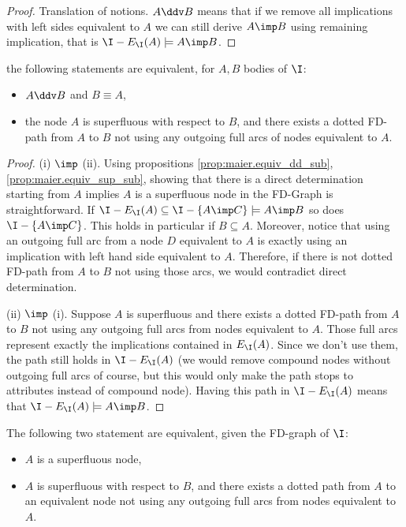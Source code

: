 \begin{proof}
Translation of notions. $A \ddv B$ means that if we remove all implications
with left sides equivalent to $A$ we can still derive $A \imp B$ using remaining
implication, that is $\I - E_{\I}(A) \models A \imp B$.
\end{proof}

\begin{proposition} \label{prop:maier.equiv_ssup_dd}
the following statements are equivalent, for $A, B$ bodies of $\I$:
\begin{itemize}
	\item[(i)] $A \ddv B$ and $B \equiv A$,
	\item[(ii)] the node $A$ is superfluous with respect to $B$, and there 
	exists 
	a dotted FD-path from $A$ to $B$ not using any outgoing full arcs of
	nodes equivalent to $A$.
\end{itemize}
	
\end{proposition}


\begin{proof} (i) $\imp$ (ii). Using propositions \ref{prop:maier.equiv_dd_sub},
\ref{prop:maier.equiv_sup_sub}, showing that there is a direct determination 
starting from $A$ implies $A$ is a superfluous node in the FD-Graph is 
straightforward. If $\I - E_{\I}(A) \subseteq \I - \{A \imp C \} \models A \imp 
B$ so does $\I - \{A \imp C \}$. This holds in particular if $B \subseteq A$. 
Moreover, notice that using an outgoing full arc from a node $D$ equivalent to 
$A$ is exactly using an implication with left hand side equivalent to $A$. 
Therefore, if there is not dotted FD-path from $A$ to $B$ not using those arcs, 
we would contradict direct determination.

\vspace{1.2em}

(ii) $\imp$ (i). Suppose $A$ is superfluous and there 
exists a dotted FD-path from $A$ to $B$ not using any outgoing full arcs 
from nodes equivalent to $A$. Those full arcs represent exactly the 
implications contained in $E_{\I}(A)$. Since we don't use them, the path still 
holds in $\I - E_{\I}(A)$ (we would remove compound nodes without outgoing full 
arcs of course, but this would only make the path stops to attributes instead 
of compound node). Having this path in $\I - E_{\I}(A)$ means that $\I - 
E_{\I}(A) \models A \imp B$.
	
\end{proof}

\begin{proposition} \label{prop:maier.equiv_sup_ssup}
	The following two statement are equivalent, given the FD-graph of $\I$:
	\begin{itemize}
		\item[(i)] $A$ is a superfluous node,
		\item[(ii)] $A$ is superfluous with respect to $B$, and there exists a
		dotted path from $A$ to an equivalent node not using any outgoing full 
		arcs from nodes	equivalent to $A$.
	\end{itemize}
	
\end{proposition}

